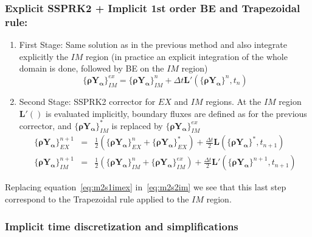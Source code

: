\documentclass[12pt]{article}
\begin{document}
\subsubsection*{Explicit SSPRK2 + Implicit 1st order BE and Trapezoidal rule:}
%
\begin{enumerate}
   \item First Stage: Same solution as in the previous method and also integrate explicitly the $IM$ region (in practice an explicit integration of the whole domain is done, followed by BE on the $IM$ region)
   \begin{equation}
     \{\mathbf{\rho Y_\alpha}\}^{ex}_{IM} = \{\mathbf{\rho Y_\alpha}\}^{n}_{IM}+\Delta t \mathbf{L}'(\{\mathbf{\rho Y_\alpha}\}^n,t_n) \label{eq:m2s1imex}
   \end{equation}

  \item Second Stage: SSPRK2 corrector for $EX$ and $IM$ regions. At the $IM$ region $\mathbf{L}'()$ is evaluated implicitly, boundary fluxes are defined as for the previous corrector, and $\{\mathbf{\rho Y_\alpha}\}^{*}_{IM}$ is replaced by $\{\mathbf{\rho Y_\alpha}\}^{ex}_{IM}$
   \begin{eqnarray}
   \{\mathbf{\rho Y_\alpha}\}^{n+1}_{EX}&=& \frac{1}{2}\left( \{\mathbf{\rho Y_\alpha}\}^{n}_{EX} +
                                                                                              \{\mathbf{\rho Y_\alpha}\}^*_{EX} \right) +
                                                   \frac{\Delta t}{2} \mathbf{L}(\{\mathbf{\rho Y_\alpha}\}^*,t_{n+1})  \label{eq:m2s2ex} \\
   \{\mathbf{\rho Y_\alpha}\}^{n+1}_{IM}&=& \frac{1}{2}\left( \{\mathbf{\rho Y_\alpha}\}^{n}_{IM} +
                                                                                             \{\mathbf{\rho Y_\alpha}\}^{ex}_{IM} \right) +
                                                   \frac{\Delta t}{2} \mathbf{L}'(\{\mathbf{\rho Y_\alpha}\}^{n+1},t_{n+1}) \label{eq:m2s2im}
   \end{eqnarray}
\end{enumerate}
%
Replacing equation~\eqref{eq:m2s1imex} in~\eqref{eq:m2s2im} we see that this last step correspond to the Trapezoidal rule applied to the $IM$ region.


\subsubsection{Implicit time discretization and simplifications}
\end{document}
